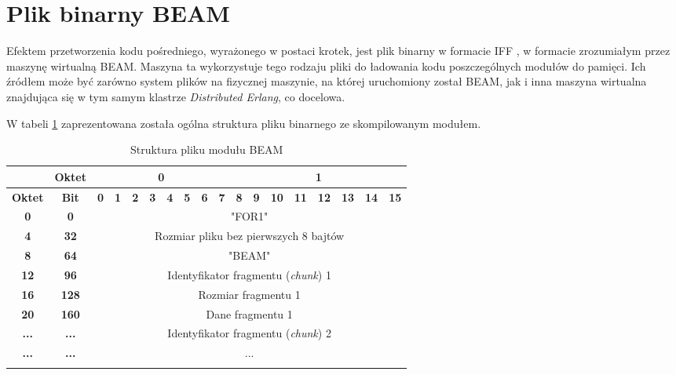 \section{Plik binarny BEAM}

Efektem przetworzenia kodu pośredniego, wyrażonego w postaci krotek, jest plik binarny w formacie IFF \cite{morrison1985ea}, w formacie zrozumiałym przez maszynę wirtualną BEAM. Maszyna ta wykorzystuje tego rodzaju pliki do ładowania kodu poszczególnych modułów do pamięci. Ich źródłem może być zarówno system plików na fizycznej maszynie, na której uruchomiony został BEAM, jak i inna maszyna wirtualna znajdująca się w tym samym klastrze \emph{Distributed Erlang}, co docelowa.

W tabeli \ref{table:beamFile} zaprezentowana została ogólna struktura pliku binarnego ze skompilowanym modułem.

\begin{longtable}{|c|c|c|c|c|c|c|c|c|c|c|c|c|c|c|c|c|c|}
\hline
         & \textbf{Oktet} & \multicolumn{8}{|c|}{\textbf{0}} & \multicolumn{8}{|c|}{\textbf{1}} \\
\hline
\textbf{Oktet} & \textbf{Bit} & \textbf{0} & \textbf{1} & \textbf{2} & \textbf{3} & \textbf{4} & \textbf{5} & \textbf{6} & \textbf{7} & \textbf{8} & \textbf{9} & \textbf{10} & \textbf{11} & \textbf{12} & \textbf{13} & \textbf{14} & \textbf{15}\\
\hline
\textbf{0} & \textbf{0} & \multicolumn{16}{|c|}{"FOR1"} \\[3ex]
\hline
\textbf{4} & \textbf{32} & \multicolumn{16}{|c|}{Rozmiar pliku bez pierwszych 8 bajtów}\\[3ex]
\hline
\textbf{8} & \textbf{64} & \multicolumn{16}{|c|}{"BEAM"} \\[3ex]
\hline
\textbf{12} & \textbf{96} & \multicolumn{16}{|c|}{Identyfikator fragmentu (\emph{chunk}) 1}\\[3ex]
\hline
\textbf{16} & \textbf{128} & \multicolumn{16}{|c|}{Rozmiar fragmentu 1} \\[3ex]
\hline
\textbf{20} & \textbf{160} & \multicolumn{16}{|c|}{Dane fragmentu 1} \\[10ex]
\hline
\textbf{...} & \textbf{...} & \multicolumn{16}{|c|}{Identyfikator fragmentu (\emph{chunk}) 2}\\[3ex]
\hline
\textbf{...} & \textbf{...} & \multicolumn{16}{|c|}{...} \\[10ex]
\hline
\caption{Struktura pliku modułu BEAM}
\label{table:beamFile} \\
\end{longtable}

